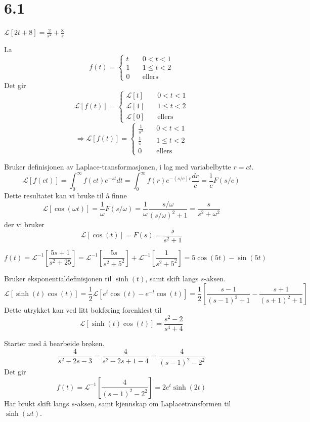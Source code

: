 \documentclass[11pt, a4paper, norsk]{NTNUoving}
\begin{document}
\section*{6.1}

\begin{oppgave} %
  $\mathscr{L}[2t+8]=\frac{2}{s^{2}}+\frac{8}{s}$
\end{oppgave}
\begin{oppgave}[12] La
  \[
f(t) =
     \begin{cases}
      t &\quad 0<t<1\\
      1 &\quad 1\leq t < 2 \\
      0 &\quad \text{ellers}
     \end{cases}
    \]
   Det gir
   \[
 \mathscr{L}[f(t)] =
     \begin{cases}
      \mathscr{L}[t] &\quad 0<t<1\\
      \mathscr{L}[1] &\quad 1\leq t < 2 \\
      \mathscr{L}[0] &\quad \text{ellers}
     \end{cases}
\]\[\Rightarrow \mathscr{L}[f(t)]=
     \begin{cases}
      \frac{1}{s^{2}} &\quad 0<t<1\\
      \frac{1}{s} &\quad 1\leq t < 2 \\
      0 &\quad \text{ellers}
     \end{cases}
    \]
\end{oppgave}
\begin{oppgave}[23]
  Bruker definisjonen av Laplace-transformasjonen, i lag med variabelbytte $r=ct$.
  \[
\mathscr{L}[f(ct)]=\int_{0}^{\infty}f(ct)e^{-st}dt=\int_{0}^{\infty}f(r)e^{-(s/c)r}\frac{dr}{c}=\frac{1}{c}F(s/c)
 \]
 Dette resultatet kan vi bruke til å finne
 \[
   \mathscr{L}[\cos(\omega t)]=\frac{1}{\omega}F(s/\omega)=\frac{1}{\omega}\frac{s/\omega}{(s/\omega)^{2}+1} =\frac{s}{s^{2}+\omega^{2}}
 \] der vi bruker
 \[
   \mathscr{L}[\cos(t)]=F(s)=\frac{s}{s^{2}+1}
 \]
\end{oppgave}
\begin{oppgave}[26]
  \[
    f(t)= \mathscr{L}^{-1}\left[\frac{5s+1}{s^{2}+25}\right]=
     \mathscr{L}^{-1}\left[\frac{5s}{s^{2}+5^{2}}\right]+\mathscr{L}^{-1}\left[\frac{1}{s^{2}+5^{2}}\right]
    = 5\cos(5t)-\sin(5t)
  \]
\end{oppgave}
\begin{oppgave}[36]
  Bruker eksponentialdefinisjonen til $\sinh(t)$, samt skift langs $s$-aksen.
  \[
    \mathscr{L}[\sinh(t)\cos(t)]=\frac{1}{2} \mathscr{L}[e^{t}\cos(t)-e^{-t}\cos(t)] = \frac{1}{2}\left[\frac{s-1}{(s-1)^{2}+1}-\frac{s+1}{(s+1)^{2}+1}\right]
  \]
  Dette utrykket kan ved litt bokføring forenklest til
  \[
    \mathscr{L}[\sinh(t)\cos(t)]=\frac{s^{2}-2}{s^{4}+4}
  \]
\end{oppgave}
\begin{oppgave}[40]
  Starter med å bearbeide brøken.
  \[
    \frac{4}{s^{2}-2s-3}=\frac{4}{s^{2}-2s+1-4}=\frac{4}{(s-1)^{2}-2^{2}}
  \]
  Det gir
  \[
    f(t)= \mathscr{L}^{-1}\left[\frac{4}{(s-1)^{2}-2^{2}}\right]=2e^{t}\sinh(2t)
  \]
  Har brukt skift langs $s$-aksen, samt kjennskap om Laplacetransformen til $\sinh(\omega t)$.
\end{oppgave}
\end{document}
